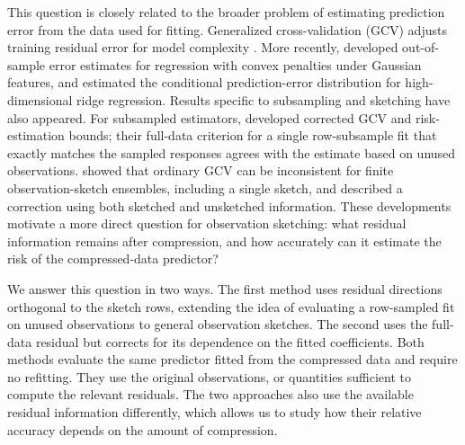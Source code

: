 \documentclass{article}
\theoremstyle{plain} %
\theoremstyle{definition} %
\theoremstyle{definition} %
\begin{document}
This question is closely related to the broader problem of estimating prediction error from the data used for fitting. Generalized cross-validation (GCV) adjusts training residual error for model complexity \citep{golub1979generalized}. More recently, \citet{bellec2023out} developed out-of-sample error estimates for regression with convex penalties under Gaussian features, and \citet{patil2022estimating} estimated the conditional prediction-error distribution for high-dimensional ridge regression. Results specific to subsampling and sketching have also appeared. For subsampled estimators, \citet{bellec2025corrected} developed corrected GCV and risk-estimation bounds; their full-data criterion for a single row-subsample fit that exactly matches the sampled responses agrees with the estimate based on unused observations. \citet{patil2024asymptotically} showed that ordinary GCV can be inconsistent for finite observation-sketch ensembles, including a single sketch, and described a correction using both sketched and unsketched information. These developments motivate a more direct question for observation sketching: what residual information remains after compression, and how accurately can it estimate the risk of the compressed-data predictor?

We answer this question in two ways. The first method uses residual directions orthogonal to the sketch rows, extending the idea of evaluating a row-sampled fit on unused observations to general observation sketches. The second uses the full-data residual but corrects for its dependence on the fitted coefficients. Both methods evaluate the same predictor fitted from the compressed data and require no refitting. They use the original observations, or quantities sufficient to compute the relevant residuals. The two approaches also use the available residual information differently, which allows us to study how their relative accuracy depends on the amount of compression.
\end{document}
